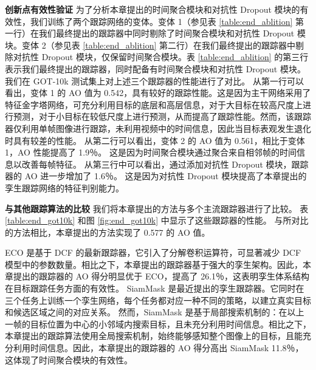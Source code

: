 \textbf{创新点有效性验证}
为了分析本章提出的时间聚合模块和对抗性 Dropout 模块的有效性，我们训练了两个跟踪网络的变体。变体 1（参见表 \ref{table:end_ablition} 第一行）在我们最终提出的跟踪器中同时剔除了时间聚合模块和对抗性 Dropout 模块。变体 2（参见表 \ref{table:end_ablition} 第二行）在我们最终提出的跟踪器中剔除对抗性 Dropout 模块，仅保留时间聚合模块。表 \ref{table:end_ablition} 的第三行表示我们最终提出的跟踪器，同时配备有时间聚合模块和对抗性 Dropout 模块。
我们在 GOT-10k 测试集上对上述三个跟踪器的性能进行了对比。
从第一行可以看出，变体 1 的 AO 值为 0.542，具有较好的跟踪性能。这是因为主干网络采用了特征金字塔网络，可充分利用目标的底层和高层信息，对于大目标在较高尺度上进行预测，对于小目标在较低尺度上进行预测，从而提高了跟踪性能。然而，该跟踪器仅利用单帧图像进行跟踪，未利用视频中的时间信息，因此当目标表观发生退化时具有较差的性能。
从第二行可以看出，变体 2 的 AO 值为 0.561，相比于变体 1，AO 性能提高了 1.9％。
这是因为时间聚合模块通过聚合来自相邻帧的时间信息以改善每帧特征。
从第三行中可以看出，通过添加对抗性 Dropout 模块，跟踪器的 AO 进一步增加了 1.6％。
这是因为对抗性 Dropout 模块提高了本章提出的孪生跟踪网络的特征判别能力。

\textbf{与其他跟踪算法的比较}
我们将本章提出的方法与多个主流跟踪器进行了比较。
表 \ref{table:end_got10k} 和图 \ref{fig:end_got10k} 中显示了这些跟踪器的性能。
与所对比的方法相比，本章提出的方法实现了 0.577 的 AO 值。

ECO \cite{danelljan2017eco} 是基于 DCF 的最新跟踪器，它引入了分解卷积运算符，可显著减少 DCF 模型中的参数数量。相比之下，本章提出的跟踪器基于强大的孪生架构。因此，本章提出的跟踪器的 AO 得分明显优于 ECO，提高了 26.1％，这表明孪生体系结构在目标跟踪任务方面的有效性。
SiamMask \cite{Wang2018SiamMask} 是最近提出的孪生跟踪器。它同时在三个任务上训练一个孪生网络，每个任务都对应一种不同的策略，以建立真实目标和候选区域之间的对应关系。
然而，SiamMask 是基于局部搜索机制的：在以上一帧的目标位置为中心的小邻域内搜索目标，且未充分利用时间信息。相比之下，本章提出的跟踪算法使用全局搜索机制，始终能够感知整个图像上的目标，且能充分利用时间信息。因此，本章提出的跟踪器的 AO 得分高出 SiamMask 11.8％，这体现了时间聚合模块的有效性。

